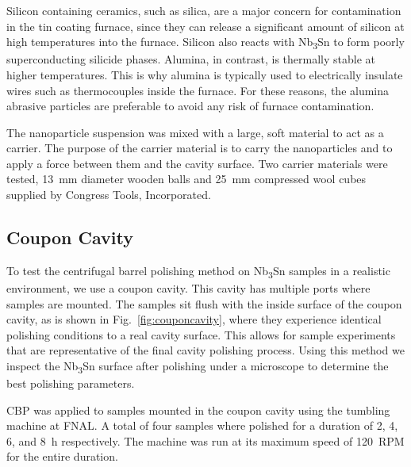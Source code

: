 \documentclass[reprint,amsmath,amssymb,aps]{revtex4-2}%
\begin{document}
Silicon containing ceramics, such as silica, are a major concern for contamination in the tin coating furnace, since they can release a significant amount of silicon at high temperatures into the furnace. Silicon also reacts with Nb\textsubscript{3}Sn to form poorly superconducting silicide phases. Alumina, in contrast, is thermally stable at higher temperatures. This is why alumina is typically used to electrically insulate wires such as thermocouples inside the furnace. For these reasons, the alumina abrasive particles are preferable to avoid any risk of furnace contamination.

The nanoparticle suspension was mixed with a large, soft material to act as a carrier. The purpose of the carrier material is to carry the nanoparticles and to apply a force between them and the cavity surface. Two carrier materials were tested, 13~mm diameter wooden balls and 25~mm compressed wool cubes supplied by Congress Tools, Incorporated.

%
\subsection{Coupon Cavity}%
\label{subsec:couponcavity}%
To test the centrifugal barrel polishing method on Nb\textsubscript{3}Sn samples in a realistic environment, we use a coupon cavity\cite{higuchi1996investigation}. This cavity has multiple ports where samples are mounted. The samples sit flush with the inside surface of the coupon cavity, as is shown in Fig.~\ref{fig:couponcavity}, where they experience identical polishing conditions to a real cavity surface. This allows for sample experiments that are representative of the final cavity polishing process. Using this method we inspect the Nb\textsubscript{3}Sn surface after polishing under a microscope to determine the best polishing parameters.

CBP was applied to samples mounted in the coupon cavity using the tumbling machine at FNAL. A total of four samples where polished for a duration of 2, 4, 6, and 8~\unit{\hour} respectively. The machine was run at its maximum speed of 120~RPM for the entire duration.
%
\end{document}
